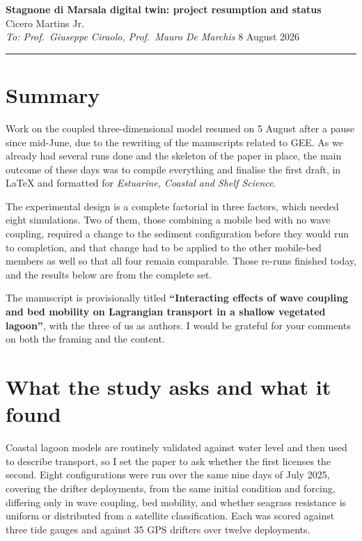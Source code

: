 \documentclass[11pt]{article}
\begin{document}
\thispagestyle{fancy}

\begin{center}
{\large\bfseries Stagnone di Marsala digital twin: project resumption and status}\\[0.3em]
Cicero Martins Jr.\\
\textit{To: Prof.\ Giuseppe Ciraolo, Prof.\ Mauro De Marchis} \hfill 8 August 2026
\end{center}

\vspace{0.2em}
\hrule
\vspace{0.6em}

\section{Summary}

Work on the coupled three-dimensional model resumed on 5 August after a pause
since mid-June, due to the rewriting of the manuscripts related to GEE. As we
already had several runs done and the skeleton of the paper in place, the main
outcome of these days was to compile everything and finalise the first draft, in
LaTeX and formatted for \textit{Estuarine, Coastal and Shelf Science}.

The experimental design is a complete factorial in three factors, which needed
eight simulations. Two of them, those combining a mobile bed with no wave
coupling, required a change to the sediment configuration before they would run
to completion, and that change had to be applied to the other mobile-bed members
as well so that all four remain comparable. Those re-runs finished today, and
the results below are from the complete set.

The manuscript is provisionally titled \textbf{``Interacting effects of wave
coupling and bed mobility on Lagrangian transport in a shallow vegetated
lagoon''}, with the three of us as authors. I would be grateful for your
comments on both the framing and the content.

\section{What the study asks and what it found}

Coastal lagoon models are routinely validated against water level and then used
to describe transport, so I set the paper to ask whether the first licenses the
second. Eight configurations were run over the same nine days of July 2025,
covering the drifter deployments, from the same initial condition and forcing,
differing only in wave coupling, bed mobility, and whether seagrass resistance is
uniform or distributed from a satellite classification. Each was scored against
three tide gauges and against 35 GPS drifters over twelve deployments.
\end{document}
